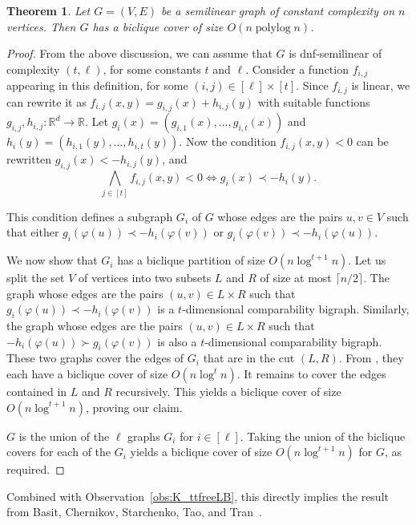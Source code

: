 \documentclass{amsart}
\newtheorem{theorem}{Theorem}%
\DeclareMathOperator{\polylog}{\mathrm{polylog}}
\begin{document}
\begin{theorem}\label{thm:semilinear}
    Let $G=(V,E)$ be a semilinear graph of constant complexity on $n$ vertices. 
    Then $G$ has a biclique cover of size $O(n \polylog n)$.
\end{theorem}
\begin{proof}
    From the above discussion, we can assume that $G$ is dnf-semilinear of complexity $(t,\ell)$, for some constants $t$ and $\ell$. 
    Consider a function $f_{i,j}$ appearing in this definition, for some $(i,j)\in [\ell]\times [t]$.
    Since $f_{i, j}$ is linear, we can rewrite it as  $f_{i,j}(x,y)=g_{i,j}(x)+h_{i,j}(y)$ with suitable functions $g_{i, j}, h_{i, j}:\mathbb{R}^d\rightarrow \mathbb{R}$. 
    Let $g_i(x) = (g_{i,1}(x),\ldots ,g_{i,t}(x))$ and $h_i(y) = (h_{i,1}(y),\ldots ,h_{i,t}(y))$.
    Now the condition $f_{i,j}(x,y)<0$ can be rewritten $g_{i, j} (x) < -h_{i, j} (y)$, and
    \[
    \bigwedge_{j\in [t]} f_{i, j}(x, y)<0
    \Leftrightarrow
    g_i (x) \prec -h_i (y).
    \]

    This condition defines a subgraph $G_i$ of $G$ whose edges are the pairs $u,v\in V$ such that either $g_i (\varphi(u)) \prec -h_i (\varphi(v))$ or 
    $g_i (\varphi(v)) \prec -h_i (\varphi(u))$.

    We now show that $G_i$ has a biclique partition of size $O(n\log^{t+1} n)$.
    Let us split the set $V$ of vertices into two subsets $L$ and $R$ of size at most $\lceil n/2\rceil$.
    The graph whose edges are the pairs $(u,v)\in L\times R$ such that $g_i (\varphi(u)) \prec -h_i (\varphi(v))$ is a $t$-dimensional comparability bigraph. Similarly, the graph whose edges are the pairs $(u,v)\in L\times R$ such that $-h_i (\varphi(u)) \succ g_i (\varphi(v))$ is also a $t$-dimensional comparability bigraph. These two graphs cover the edges of $G_i$ that are in the cut $(L,R)$. 
    From , they each have a biclique cover of size $O(n\log^t n)$.
    It remains to cover the edges contained in $L$ and $R$ recursively. This yields a biclique cover of size $O(n\log^{t+1} n)$, proving our claim.
    
    $G$ is the union of the $\ell$ graphs $G_i$ for $i\in [\ell]$. Taking the union of the biclique covers for each of the $G_i$ yields a biclique cover of size $O(n \log^{t+1}n)$ for $G$, as required. 
\end{proof}

Combined with Observation~\ref{obs:K_ttfreeLB}, this directly implies the result from Basit, Chernikov, Starchenko, Tao,  and Tran~\cite{BCSTT21}. 
\end{document}
